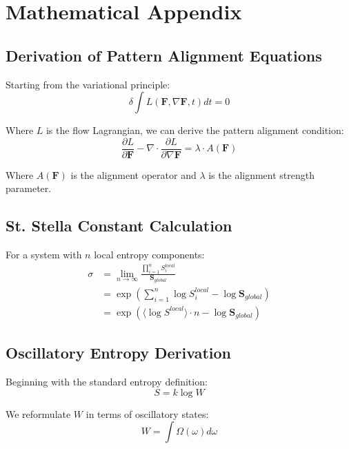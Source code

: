 \documentclass[12pt,a4paper]{article}
\begin{document}
\section{Mathematical Appendix}

\subsection{Derivation of Pattern Alignment Equations}

Starting from the variational principle:
\begin{equation}
\delta \int L(\mathbf{F}, \nabla \mathbf{F}, t) dt = 0
\end{equation}

Where $L$ is the flow Lagrangian, we can derive the pattern alignment condition:
\begin{equation}
\frac{\partial L}{\partial \mathbf{F}} - \nabla \cdot \frac{\partial L}{\partial \nabla \mathbf{F}} = \lambda \cdot A(\mathbf{F})
\end{equation}

Where $A(\mathbf{F})$ is the alignment operator and $\lambda$ is the alignment strength parameter.

\subsection{St. Stella Constant Calculation}

For a system with $n$ local entropy components:
\begin{align}
\sigma &= \lim_{n \to \infty} \frac{\prod_{i=1}^{n} S_i^{local}}{\mathbf{S}_{global}} \\
&= \exp\left(\sum_{i=1}^{n} \log S_i^{local} - \log \mathbf{S}_{global}\right) \\
&= \exp\left(\langle \log S^{local} \rangle \cdot n - \log \mathbf{S}_{global}\right)
\end{align}

\subsection{Oscillatory Entropy Derivation}

Beginning with the standard entropy definition:
\begin{equation}
S = k \log W
\end{equation}

We reformulate $W$ in terms of oscillatory states:
\begin{equation}
W = \int \Omega(\omega) d\omega
\end{equation}
\end{document}
